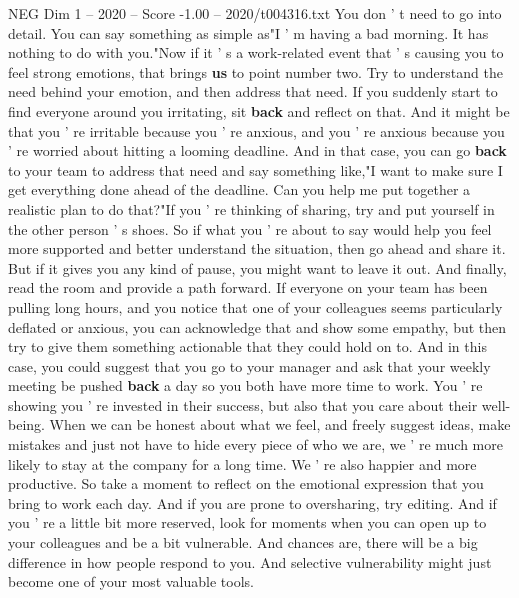 \begin{textsample}{NEG Dim 1 – 2020 – Score -1.00 – 2020/t004316.txt}
You don ' t need to go into detail.
You can say something as simple as"I ' m having a bad morning.
It has nothing to do with you."Now if it ' s a work-related event that ' s causing you to feel strong emotions, that brings \textbf{us} to point number two.
Try to understand the need behind your emotion, and then address that need.
If you suddenly start to find everyone around you irritating, sit \textbf{back} and reflect on that.
And it might be that you ' re irritable because you ' re anxious, and you ' re anxious because you ' re worried about hitting a looming deadline.
And in that case, you can go \textbf{back} to your team to address that need and say something like,"I want to make sure I get everything done ahead of the deadline.
Can you help me put together a realistic plan to do that?"If you ' re thinking of sharing, try and put yourself in the other person ' s shoes.
So if what you ' re about to say would help you feel more supported and better understand the situation, then go ahead and share it.
But if it gives you any kind of pause, you might want to leave it out.
And finally, read the room and provide a path forward.
If everyone on your team has been pulling long hours, and you notice that one of your colleagues seems particularly deflated or anxious, you can acknowledge that and show some empathy, but then try to give them something actionable that they could hold on to.
And in this case, you could suggest that you go to your manager and ask that your weekly meeting be pushed \textbf{back} a day so you both have more time to work.
You ' re showing you ' re invested in their success, but also that you care about their well-being.
When we can be honest about what we feel, and freely suggest ideas, make mistakes and just not have to hide every piece of who we are, we ' re much more likely to stay at the company for a long time.
We ' re also happier and more productive.
So take a moment to reflect on the emotional expression that you bring to work each day.
And if you are prone to oversharing, try editing.
And if you ' re a little bit more reserved, look for moments when you can open up to your colleagues and be a bit vulnerable.
And chances are, there will be a big difference in how people respond to you.
And selective vulnerability might just become one of your most valuable tools.

\end{textsample}
